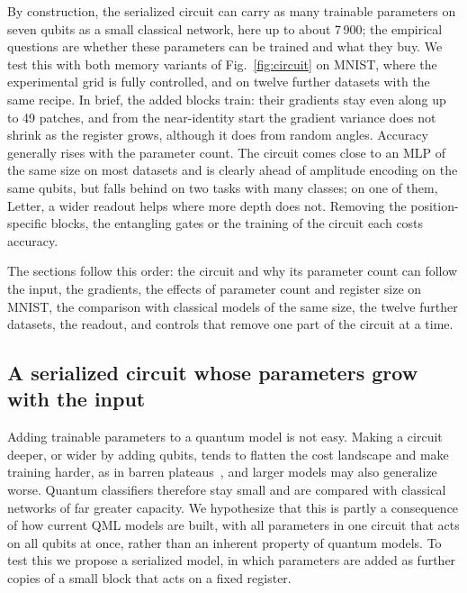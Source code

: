\documentclass[11pt]{article}
\begin{document}
By construction, the serialized circuit can carry as many trainable parameters on seven qubits as a small classical network, here up to about 7\,900; the empirical questions are whether these parameters can be trained and what they buy. We test this with both memory variants of Fig.~\ref{fig:circuit} on MNIST, where the experimental grid is fully controlled, and on twelve further datasets with the same recipe. In brief, the added blocks train: their gradients stay even along up to 49 patches, and from the near-identity start the gradient variance does not shrink as the register grows, although it does from random angles. Accuracy generally rises with the parameter count. The circuit comes close to an MLP of the same size on most datasets and is clearly ahead of amplitude encoding on the same qubits, but falls behind on two tasks with many classes; on one of them, Letter, a wider readout helps where more depth does not. Removing the position-specific blocks, the entangling gates or the training of the circuit each costs accuracy.

The sections follow this order: the circuit and why its parameter count can follow the input, the gradients, the effects of parameter count and register size on MNIST, the comparison with classical models of the same size, the twelve further datasets, the readout, and controls that remove one part of the circuit at a time.

\subsection{A serialized circuit whose parameters grow with the input}
\label{sec:res-circuit}

Adding trainable parameters to a quantum model is not easy. Making a circuit deeper, or wider by adding qubits, tends to flatten the cost landscape and make training harder, as in barren plateaus~\cite{mcclean2018barren,wang2020noise,holmes2022connecting}, and larger models may also generalize worse. Quantum classifiers therefore stay small and are compared with classical networks of far greater capacity. We hypothesize that this is partly a consequence of how current QML models are built, with all parameters in one circuit that acts on all qubits at once, rather than an inherent property of quantum models. To test this we propose a serialized model, in which parameters are added as further copies of a small block that acts on a fixed register.
\end{document}
